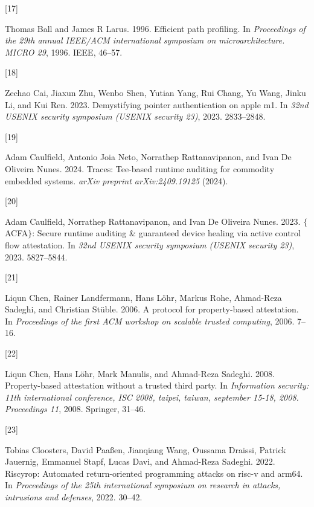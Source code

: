 \documentclass[a4paper, nobind]{templates/ociamthesis}
\newlength{\cslhangindent}
\newlength{\csllabelwidth}
\newenvironment{CSLReferences}[2] %
{\begin{list}{}{%
	\setlength{\itemindent}{0pt}
	\setlength{\leftmargin}{0pt}
	\setlength{\parsep}{0pt}
	\ifodd #1
	\setlength{\leftmargin}{\cslhangindent}
	\setlength{\itemindent}{-1\cslhangindent}
	\fi
	\setlength{\itemsep}{#2\baselineskip}}}
{\end{list}}
\newcommand{\CSLLeftMargin}[1]{\parbox[t]{\csllabelwidth}{\strut#1\strut}}
\newcommand{\CSLRightInline}[1]{\parbox[t]{\linewidth - \csllabelwidth}{\strut#1\strut}}
\begin{document}
\begin{CSLReferences}{0}{0}
\CSLLeftMargin{{[}17{]} }%
\CSLRightInline{Thomas Ball and James R Larus. 1996. Efficient path profiling. In \emph{Proceedings of the 29th annual IEEE/ACM international symposium on microarchitecture. MICRO 29}, 1996. IEEE, 46--57.}

\CSLLeftMargin{{[}18{]} }%
\CSLRightInline{Zechao Cai, Jiaxun Zhu, Wenbo Shen, Yutian Yang, Rui Chang, Yu Wang, Jinku Li, and Kui Ren. 2023. Demystifying pointer authentication on apple m1. In \emph{32nd USENIX security symposium (USENIX security 23)}, 2023. 2833--2848.}

\CSLLeftMargin{{[}19{]} }%
\CSLRightInline{Adam Caulfield, Antonio Joia Neto, Norrathep Rattanavipanon, and Ivan De Oliveira Nunes. 2024. Traces: Tee-based runtime auditing for commodity embedded systems. \emph{arXiv preprint arXiv:2409.19125} (2024).}

\CSLLeftMargin{{[}20{]} }%
\CSLRightInline{Adam Caulfield, Norrathep Rattanavipanon, and Ivan De Oliveira Nunes. 2023. \(\{\)ACFA\(\}\): Secure runtime auditing \& guaranteed device healing via active control flow attestation. In \emph{32nd USENIX security symposium (USENIX security 23)}, 2023. 5827--5844.}

\CSLLeftMargin{{[}21{]} }%
\CSLRightInline{Liqun Chen, Rainer Landfermann, Hans Löhr, Markus Rohe, Ahmad-Reza Sadeghi, and Christian Stüble. 2006. A protocol for property-based attestation. In \emph{Proceedings of the first ACM workshop on scalable trusted computing}, 2006. 7--16.}

\CSLLeftMargin{{[}22{]} }%
\CSLRightInline{Liqun Chen, Hans Löhr, Mark Manulis, and Ahmad-Reza Sadeghi. 2008. Property-based attestation without a trusted third party. In \emph{Information security: 11th international conference, ISC 2008, taipei, taiwan, september 15-18, 2008. Proceedings 11}, 2008. Springer, 31--46.}

\CSLLeftMargin{{[}23{]} }%
\CSLRightInline{Tobias Cloosters, David Paaßen, Jianqiang Wang, Oussama Draissi, Patrick Jauernig, Emmanuel Stapf, Lucas Davi, and Ahmad-Reza Sadeghi. 2022. Riscyrop: Automated return-oriented programming attacks on risc-v and arm64. In \emph{Proceedings of the 25th international symposium on research in attacks, intrusions and defenses}, 2022. 30--42.}


\end{CSLReferences}
\end{document}
